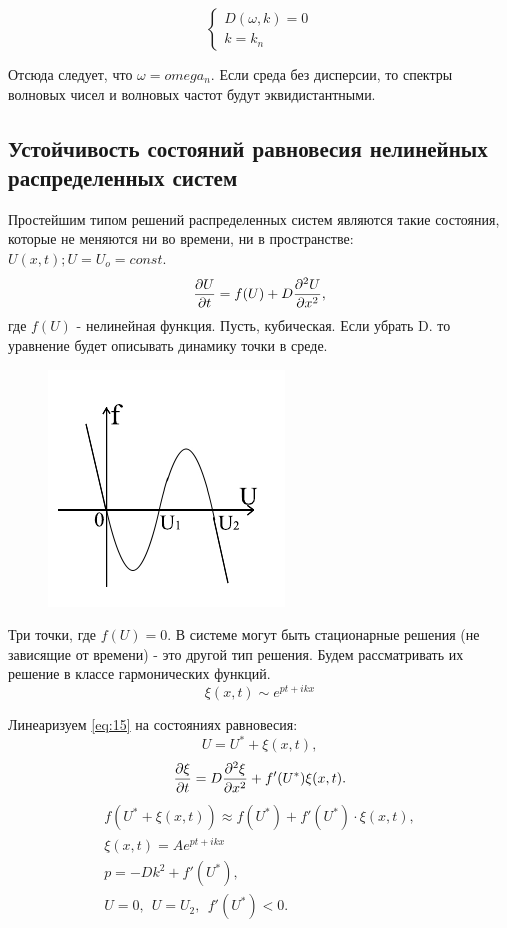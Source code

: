 \begin{equation}
	\begin{cases}
		D(\omega,k)=0 \\
		k=k_n
	\end{cases}
	\label{eq:14}
\end{equation}

Отсюда следует, что $\omega=omega_n$. Если среда без дисперсии, то спектры волновых чисел и волновых частот будут эквидистантными. 

\subsection{Устойчивость состояний равновесия нелинейных распределенных систем}
Простейшим типом решений распределенных систем являются такие состояния, которые не меняются ни во времени, ни в пространстве: $U(x,t); U=U_o=const$.
\begin{equation}
	\pdv{U}{t}=f(U)+D\pdv[2]{U}{x},
	\label{eq:15}
\end{equation}
где $f(U)$ - нелинейная функция. Пусть, кубическая. Если убрать D. то уравнение будет описывать динамику точки в среде.
\begin{figure}[H]
	\centering
	\includegraphics[width=0.5\linewidth]{fig/fig6.pdf}   
\end{figure}

Три точки, где $f(U)=0$. В системе могут быть стационарные решения (не зависящие от времени) - это другой тип решения. Будем рассматривать их решение в классе гармонических функций. 
\begin{equation*}
	\xi(x,t) \sim e^{pt+ikx}
\end{equation*}

Линеаризуем \eqref{eq:15} на состояниях равновесия:
\begin{equation*}
	U=U^*+\xi(x,t),
\end{equation*}
\begin{equation}
	\pdv{\xi}{t}=D\pdv[2]{\xi}{x}+f'(U^*)\xi(x,t).
	\label{eq:16}
\end{equation}
\begin{gather*}
	f(U^*+\xi(x,t))\approx f(U^*)+f'(U^*)\cdot\xi(x,t), \\ \xi(x,t)=A e^{pt+ikx} \\
	p =-Dk^2+f'(U^*), \\ U=0,~~U=U_2,~~f'(U^*)<0.
\end{gather*}

